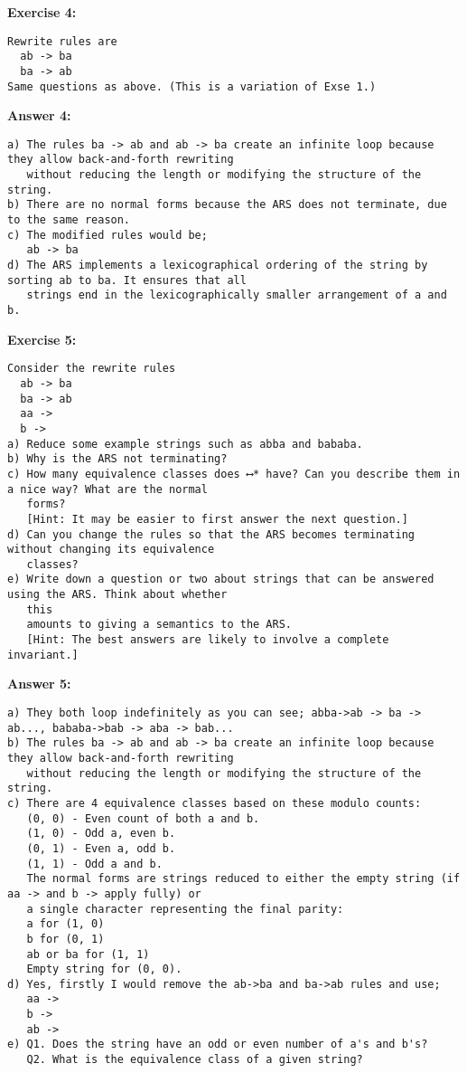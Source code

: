 \documentclass{article}
\theoremstyle{theorem}
\theoremstyle{definition}
\theoremstyle{remark}
\begin{document}
\textbf{Exercise 4:}
\begin{verbatim}
Rewrite rules are
  ab -> ba
  ba -> ab
Same questions as above. (This is a variation of Exse 1.)
\end{verbatim}

\textbf{Answer 4:}
\begin{verbatim}
a) The rules ba -> ab and ab -> ba create an infinite loop because they allow back-and-forth rewriting
   without reducing the length or modifying the structure of the string.
b) There are no normal forms because the ARS does not terminate, due to the same reason.
c) The modified rules would be;
   ab -> ba
d) The ARS implements a lexicographical ordering of the string by sorting ab to ba. It ensures that all 
   strings end in the lexicographically smaller arrangement of a and b.
\end{verbatim}

\textbf{Exercise 5:}
\begin{verbatim}
Consider the rewrite rules
  ab -> ba
  ba -> ab
  aa ->
  b ->
a) Reduce some example strings such as abba and bababa.
b) Why is the ARS not terminating?
c) How many equivalence classes does ⟷* have? Can you describe them in a nice way? What are the normal 
   forms?
   [Hint: It may be easier to first answer the next question.]
d) Can you change the rules so that the ARS becomes terminating without changing its equivalence
   classes?
e) Write down a question or two about strings that can be answered using the ARS. Think about whether 
   this 
   amounts to giving a semantics to the ARS.
   [Hint: The best answers are likely to involve a complete invariant.]
\end{verbatim}

\textbf{Answer 5:}
\begin{verbatim}
a) They both loop indefinitely as you can see; abba->ab -> ba -> ab..., bababa->bab -> aba -> bab...
b) The rules ba -> ab and ab -> ba create an infinite loop because they allow back-and-forth rewriting
   without reducing the length or modifying the structure of the string.
c) There are 4 equivalence classes based on these modulo counts:
   (0, 0) - Even count of both a and b.
   (1, 0) - Odd a, even b.
   (0, 1) - Even a, odd b.
   (1, 1) - Odd a and b.
   The normal forms are strings reduced to either the empty string (if aa -> and b -> apply fully) or  
   a single character representing the final parity:
   a for (1, 0)
   b for (0, 1)
   ab or ba for (1, 1)
   Empty string for (0, 0).
d) Yes, firstly I would remove the ab->ba and ba->ab rules and use;
   aa ->
   b ->
   ab ->
e) Q1. Does the string have an odd or even number of a's and b's?
   Q2. What is the equivalence class of a given string?
\end{verbatim}
\end{document}

